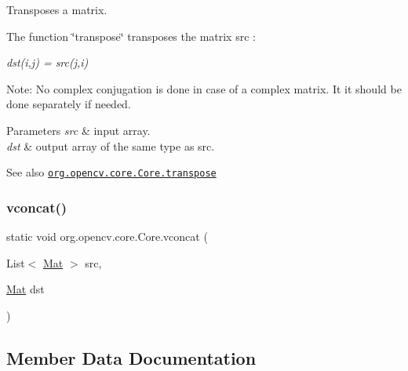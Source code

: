 Transposes a matrix.

The function \char`\"{}transpose\char`\"{} transposes the matrix {\ttfamily src} \+:

{\itshape dst(i,j) = src(j,i)}

Note\+: No complex conjugation is done in case of a complex matrix. It it should be done separately if needed.


\begin{DoxyParams}{Parameters}
{\em src} & input array. \\
\hline
{\em dst} & output array of the same type as {\ttfamily src}.\\
\hline
\end{DoxyParams}
\begin{DoxySeeAlso}{See also}
\href{http://docs.opencv.org/modules/core/doc/operations_on_arrays.html#transpose}{\tt org.\+opencv.\+core.\+Core.\+transpose} 
\end{DoxySeeAlso}
\mbox{\label{classorg_1_1opencv_1_1core_1_1_core_a8dee19abadf7067469cd4532a2fd62fd}} 
\subsubsection{\texorpdfstring{vconcat()}{vconcat()}}
{\footnotesize\ttfamily static void org.\+opencv.\+core.\+Core.\+vconcat (\begin{DoxyParamCaption}\item[{List$<$ \mbox{\hyperlink{classorg_1_1opencv_1_1core_1_1_mat}{Mat}} $>$}]{src,  }\item[{\mbox{\hyperlink{classorg_1_1opencv_1_1core_1_1_mat}{Mat}}}]{dst }\end{DoxyParamCaption})\hspace{0.3cm}{\ttfamily [static]}}



\subsection{Member Data Documentation}
\mbox{\label{classorg_1_1opencv_1_1core_1_1_core_a6f74a56e173ada31969137d7d80d44b5}} 
